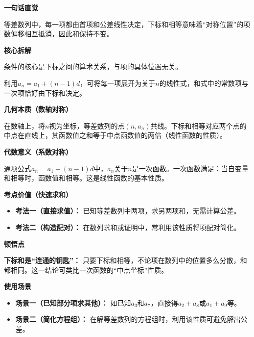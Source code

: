 \begin{explanationbox}
\textbf{\textcolor{CExplanation}{一句话直觉}}

等差数列中，每一项都由首项和公差线性决定，下标和相等意味着“对称位置”的项数偏移相互抵消，因此和保持不变。

\medskip
\textbf{\textcolor{CExplanation}{核心拆解}}
\begin{description}[style=nextline, leftmargin=2.8em, labelsep=0.5em, itemsep=0.45em]
    \item[\textbf{要点一（下标和相等）：}] 条件的核心是下标之间的算术关系，与项的具体位置无关。
    \item[\textbf{要点二（通项展开）：}] 利用$a_n=a_1+(n-1)d$，可将每一项展开为关于$n$的线性式，和式中的常数项与一次项恰好由下标和决定。
\end{description}

\medskip
\textbf{\textcolor{CExplanation}{几何本质（数轴对称）}}

在数轴上，将$n$视为坐标，等差数列的点$(n,a_n)$共线。下标和相等对应两个点的中点在直线上，其函数值之和等于中点函数值的两倍（线性函数的性质）。

\medskip
\textbf{\textcolor{CExplanation}{代数意义（系数对称）}}

通项公式$a_n=a_1+(n-1)d$中，$a_n$关于$n$是一次函数。一次函数满足：当自变量和相等时，函数值和相等。这是线性函数的基本性质。

\medskip
\textbf{\textcolor{CExplanation}{考点价值（快速求和）}}
\begin{itemize}[leftmargin=*, itemsep=0.5em, topsep=0.4em]
    \item \textbf{考法一（直接求值）：} 已知等差数列中两项，求另两项和，无需计算公差。
    \item \textbf{考法二（构造配对）：} 在数列求和或证明中，常利用该性质将项配对简化。
\end{itemize}

\medskip
\textbf{\textcolor{CExplanation}{顿悟点}}

\textbf{下标和是“连通的钥匙”：} 只要下标和相等，不论项在数列中的位置多么分散，和都相同。这一结论可类比一次函数的“中点坐标”性质。

\medskip
\textbf{\textcolor{CExplanation}{使用场景}}
\begin{itemize}[leftmargin=*, itemsep=0.5em, topsep=0.4em]
    \item \textbf{场景一（已知部分项求其他）：} 如已知$a_3$和$a_7$，直接得$a_2+a_8$或$a_1+a_9$等。
    \item \textbf{场景二（简化方程组）：} 在解等差数列的方程组时，利用该性质可避免解出公差。
\end{itemize}
\end{explanationbox}

